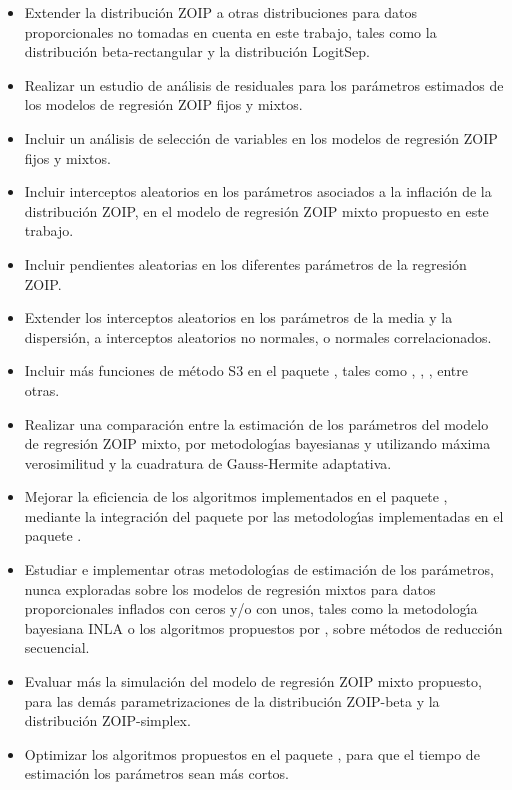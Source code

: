 \begin{itemize}
	\item Extender la distribuci\'{o}n ZOIP a otras distribuciones para datos proporcionales no tomadas en cuenta en este trabajo, tales como la distribuci\'{o}n beta-rectangular y la distribuci\'{o}n LogitSep.
	\item Realizar un estudio de an\'{a}lisis de residuales para los par\'{a}metros estimados de los modelos de regresi\'{o}n ZOIP fijos y mixtos.
	\item Incluir un an\'{a}lisis de selecci\'{o}n de variables en los modelos de regresi\'{o}n ZOIP fijos y mixtos.
	\item Incluir interceptos aleatorios en los par\'{a}metros asociados a la inflaci\'{o}n de la distribuci\'{o}n ZOIP, en el modelo de regresi\'{o}n ZOIP mixto propuesto en este trabajo.
\item Incluir pendientes aleatorias en los diferentes par\'{a}metros de la regresi\'{o}n ZOIP.
	\item Extender los interceptos aleatorios en los par\'{a}metros de la media y la dispersi\'{o}n, a interceptos aleatorios no normales, o normales correlacionados.
	\item Incluir m\'{a}s funciones de m\'{e}todo S3 en el paquete , tales como ,  , , entre otras.
	\item Realizar una comparaci\'{o}n entre la estimaci\'{o}n de los par\'{a}metros del modelo de regresi\'{o}n ZOIP mixto, por metodolog\'{\i}as bayesianas y utilizando m\'{a}xima verosimilitud y la cuadratura de Gauss-Hermite adaptativa.
		\item Mejorar la eficiencia de los algoritmos implementados en el paquete , mediante la integraci\'{o}n del paquete  por las metodolog\'{\i}as implementadas en el paquete .
	\item Estudiar e implementar otras metodolog\'{\i}as de estimaci\'{o}n de los par\'{a}metros, nunca exploradas sobre los modelos de regresi\'{o}n mixtos para datos proporcionales inflados con ceros y/o con unos, tales como la metodolog\'{\i}a bayesiana INLA o los algoritmos propuestos por \cite{Ogden1}, sobre m\'{e}todos de reducci\'{o}n secuencial. 
	\item Evaluar m\'{a}s la simulaci\'{o}n del modelo de regresi\'{o}n ZOIP mixto propuesto, para las dem\'{a}s parametrizaciones de la distribuci\'{o}n ZOIP-beta y la distribuci\'{o}n ZOIP-simplex.
	\item Optimizar los algoritmos propuestos en el paquete , para que el tiempo de estimaci\'{o}n los par\'{a}metros sean m\'{a}s cortos.

\end{itemize}
